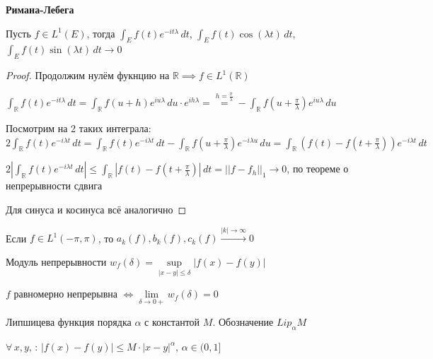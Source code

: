 \begin{lemma}
    \textbf{Римана-Лебега}

    Пусть $f \in L^1 (E)$, тогда $\int_E f(t) e^{-i t \lambda} \, dt$, $\int_E f(t) \cos (\lambda t) \, dt$, $\int_E f(t) \sin (\lambda t) \, dt \rightarrow 0$
\end{lemma}

\begin{proof}
    Продолжим нулём фукнцию на $\mathbb{R} \implies f \in L^1 (\mathbb{R})$

    $\int_{\mathbb{R}} f(t) e^{-i t \lambda} \, dt = \int_{\mathbb{R}} f(u + h) e^{iu\lambda} \, du \cdot  e^{ih\lambda} = \overset{h = \frac{\pi}{\lambda}}{=} - \int_{\mathbb{R}} f(u + \frac{\pi}{\lambda}) e^{iu\lambda} \, du$

    Посмотрим на 2 таких интеграла: $2 \int_{\mathbb{R}} f(t) e^{-i \lambda t} \, dt = \int_{\mathbb{R}} f(t) e^{-i \lambda t} \, dt - \int_{\mathbb{R}} f(u + \frac{\pi}{\lambda}) e^{-i\lambda u} \, du = \int_{\mathbb{R}} (f(t) - f(t + \frac{\pi}{\lambda})) e^{-i \lambda t} \, dt $

    $2 \left | \int_{\mathbb{R}} f(t) e^{-i \lambda t} \, dt \right | \leqslant \int_{\mathbb{R}} \left | f(t) - f(t + \frac{\pi}{\lambda}) \right | \, dt = || f - f_h ||_1 \rightarrow 0$, по теореме о непрерывности сдвига

    Для синуса и косинуса всё аналогично
\end{proof}

\begin{consequence}
    Если $f \in L^1 (-\pi, \pi)$, то $a_k (f), b_k (f), c_k (f) \overset{|k| \to \infty}{\rightarrow} 0$
\end{consequence}

\begin{definition}
    Модуль непрерывности $w_f (\delta) = \sup\limits_{|x - y| \leqslant \delta} |f(x) - f(y)|$

    \begin{remark}
        $f$ равномерно непрерывна $\Longleftrightarrow \lim\limits_{\delta \to 0+} w_f (\delta) = 0$
    \end{remark}
\end{definition}

\begin{definition}
    Липшицева функция порядка $\alpha$ с константой $M$. Обозначение $Lip_\alpha M$

    $\forall \, x, y, \, : \, |f(x) - f(y)| \leqslant M \cdot |x - y|^\alpha$, $\alpha \in (0, 1]$
\end{definition}

